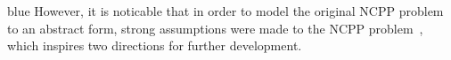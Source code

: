 \documentclass[Afour,sageh,times]{sagej}
\begin{document}
\begin{color}{blue}
However, it is noticable that in order to model the original NCPP problem to an abstract form, strong assumptions were made to the NCPP problem~\cite{Yang2020Cellular}, which inspires two directions for further development. 
\end{color}
\end{document}
